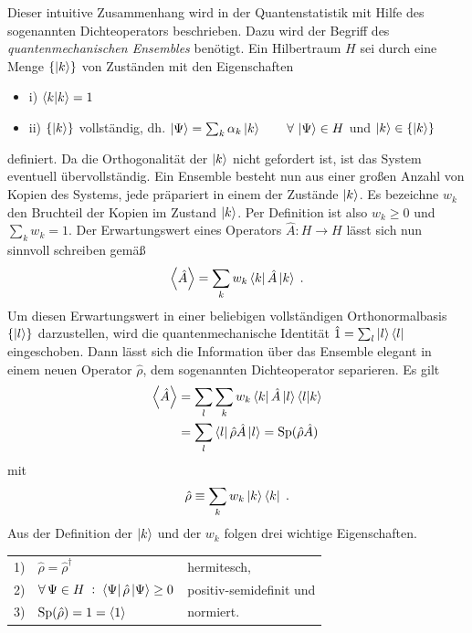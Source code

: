 Dieser intuitive Zusammenhang wird in der Quantenstatistik mit Hilfe des sogenannten Dichteoperators beschrieben. Dazu wird der Begriff des \emph{quantenmechanischen Ensembles} benötigt. Ein Hilbertraum $H$ sei durch eine Menge $\{\ket{k}\}$ von Zuständen mit den Eigenschaften
\begin{itemize}
  \item{i)} $\bra{k}\ket{k} = 1$
  \item{ii)} $\{\ket{k}\}$ vollständig, dh. $\ket{\Psi}=\sum_k \alpha_k\ket{k} \qquad \forall \, \ket{\Psi}\in H$ und $\ket{k}\in\{\ket{k}\}$
\end{itemize}
definiert. Da die Orthogonalität der $\ket{k}$ nicht gefordert ist, ist das System eventuell übervollständig. Ein Ensemble besteht nun aus einer großen Anzahl von Kopien des Systems, jede präpariert in einem der Zustände $\ket{k}$. Es bezeichne $w_k$ den Bruchteil der Kopien im Zustand $\ket{k}$. Per Definition ist also $w_k\geq 0$ und $\sum_k w_k = 1$. Der Erwartungswert eines Operators ${\hat{A}:H\rightarrow H}$ lässt sich nun sinnvoll schreiben gemäß
\begin{equation*}
  \expval{\hat{A}} = \sum_k w_k \bra{k}\hat{A}\ket{k} \; .
\end{equation*}
Um diesen Erwartungswert in einer beliebigen vollständigen Orthonormalbasis $\{\ket{l}\}$ darzustellen, wird die quantenmechanische Identität $\hat{1}=\sum_l \ket{l}\bra{l}$ eingeschoben. Dann lässt sich die Information über das Ensemble elegant in einem neuen Operator $\hat{\rho}$, dem sogenannten Dichteoperator separieren. Es gilt
\begin{align}
  \expval{\hat{A}} &= \sum_l \sum_k  w_k \bra{k}\hat{A}\ket{l}\bra{l}\ket{k} \\
   &= \sum_l \bra{l}\hat{\rho} \hat{A}\ket{l} = \text{Sp}(\hat{\rho} \hat{A})
   \label{eq:expval}
\end{align}
mit
\begin{equation}
  \hat{\rho} \equiv \sum_k w_k\ket{k}\bra{k} \; .
  \label{eq:dichteoperator}
\end{equation}
Aus der Definition der $\ket{k}$ und der $w_k$ folgen drei wichtige Eigenschaften.

\begin{tabular}{l l l}
  1)  & $\hat{\rho}=\hat{\rho}^{\dagger}$ & hermitesch, \\
  2)  & $\forall \,\Psi\in H \; :\; \bra{\Psi} \hat{\rho} \ket{\Psi} \geq 0$ & positiv-semidefinit und \\
  3)  & $\text{Sp}(\hat{\rho})=1 = \expval{1}$ & normiert. \\
\end{tabular}

